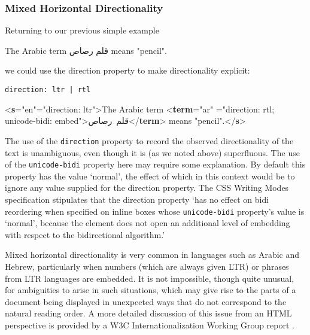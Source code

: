 \subsubsection[{Mixed Horizontal Directionality}]{Mixed Horizontal Directionality}\label{WDWMEG5}\par
Returning to our previous simple example \par\hfill\bgroup\exampleFont\vskip 10pt\begin{shaded}
\obeyspaces The Arabic term قلم رصاص means "pencil".\end{shaded}
\par\egroup 
\par
we could use the direction property to make directionality explicit:\par
\texttt{direction: ltr | rtl}\par\bgroup{}\exampleFont \begin{shaded}\noindent\mbox{}{<\textbf{s}\hspace*{1em}{xml:lang}="{en}"\hspace*{1em}{style}="{direction: ltr}">}The Arabic term\mbox{}\newline 
{<\textbf{term}\hspace*{1em}{xml:lang}="{ar}"\mbox{}\newline 
\hspace*{1em}\hspace*{1em}{style}="{direction: rtl; unicode-bidi: embed}">}\hbox{قلم رصاص}{</\textbf{term}>} means "pencil".{</\textbf{s}>}\end{shaded}\egroup\par \par
The use of the \texttt{direction} property to record the observed directionality of the text is unambiguous, even though it is (as we noted above) superfluous. The use of the \texttt{unicode-bidi} property here may require some explanation. By default this property has the value ‘normal’, the effect of which in this context would be to ignore any value supplied for the direction property. The CSS Writing Modes specification stipulates that the direction property ‘has no effect on bidi reordering when specified on inline boxes whose \texttt{unicode-bidi} property’s value is ‘normal’, because the element does not open an additional level of embedding with respect to the bidirectional algorithm.’\par
Mixed horizontal directionality is very common in languages such as Arabic and Hebrew, particularly when numbers (which are always given LTR) or phrases from LTR languages are embedded. It is not impossible, though quite unusual, for ambiguities to arise in such situations, which may give rise to the parts of a document being displayed in unexpected ways that do not correspond to the natural reading order. A more detailed discussion of this issue from an HTML perspective is provided by a W3C Internationalization Working Group report .
